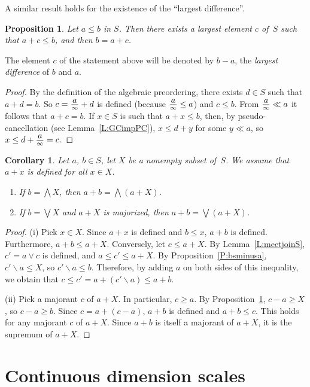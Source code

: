 \documentclass[psamsfonts,reqno]{memo-l}
\theoremstyle{plain}
\newtheorem{proposition}[lemma]{Proposition}
\newtheorem{corollary}[lemma]{Corollary}
\theoremstyle{definition}
\theoremstyle{remark}
\numberwithin{equation}{section}
\newcommand{\sd}{\smallsetminus}
\newcommand{\di}[1]{\tfrac{\mathstrut\textstyle{#1}}{\scriptstyle{\infty}}}
\begin{document}
A similar result holds for the existence of the ``largest difference''.

\begin{proposition}\label{P:blminusa}
Let $a\leq b$ in $S$. Then there exists a largest element $c$ of~$S$ such that
$a+c\leq b$, and then $b=a+c$.
\end{proposition}

The element $c$ of the statement above will be denoted by $b-a$, the
\emph{largest difference} of $b$ and $a$.

\begin{proof}
By the definition of the algebraic preordering, there exists $d\in S$ such
that $a+d=b$. So $c=\di{a}+d$ is defined (because $\di{a}\leq a$) and
$c\leq b$. {}From $\di{a}\ll a$ it follows that $a+c=b$. If
$x\in S$ is such that $a+x\leq b$, then, by pseudo-cancellation
(see Lemma~\ref{L:GCimpPC}), $x\leq d+y$ for some $y\ll a$, so
$x\leq d+\di{a}=c$.
\end{proof}

\begin{corollary}\label{C:+MJ}
Let $a$, $b\in S$, let $X$ be a nonempty subset of~$S$.
We assume that $a+x$ is defined for all $x\in X$.
\begin{enumerate}
\item If $b=\bigwedge X$, then $a+b=\bigwedge(a+X)$.

\item If $b=\bigvee X$ and $a+X$ is majorized, then $a+b=\bigvee(a+X)$.
\end{enumerate}
\end{corollary}

\begin{proof}
(i) Pick $x\in X$. Since $a+x$ is defined and $b\leq x$, $a+b$ is defined.
Furthermore, $a+b\leq a+X$. Conversely, let $c\leq a+X$. By
Lemma~\ref{L:meetjoinS}, $c'=a\vee c$ is defined, and $a\leq c'\leq a+X$.
By Proposition~\ref{P:bsminusa}, $c'\sd a\leq X$, so
$c'\sd a\leq b$. Therefore, by adding $a$ on both sides of this inequality,
we obtain that $c\leq c'=a+(c'\sd a)\leq a+b$.

(ii) Pick a majorant $c$ of $a+X$. In particular, $c\geq a$. By
Proposition~\ref{P:blminusa}, $c-a\geq X$, so
$c-a\geq b$. Since $c=a+(c-a)$, $a+b$ is defined and $a+b\leq c$.
This holds for any majorant $c$ of $a+X$. Since $a+b$ is itself a majorant
of $a+X$, it is the supremum of $a+X$.
\end{proof}


\chapter{Continuous dimension scales}
\end{document}
